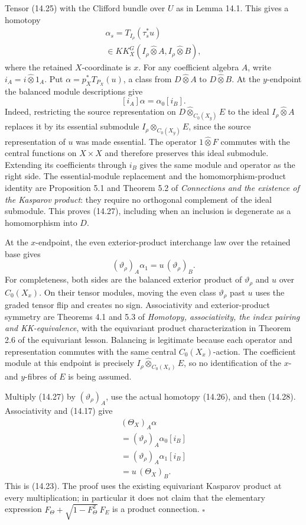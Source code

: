 \documentclass[
  11pt,
]{article}
\begin{document}
Tensor (14.25) with the Clifford bundle over \(U\) as in Lemma 14.1.
This gives a homotopy \[
\begin{gathered}
\alpha_s=T_{I_\rho}(\tau_s^*u)\\
\in KK_X^G(I_\rho\widehat\otimes A,
                    I_\rho\widehat\otimes B),
\end{gathered}
\tag{14.26}
\] where the retained \(X\)-coordinate is \(x\). For any coefficient
algebra \(A\), write \(i_A=i\widehat\otimes1_A\). Put
\(\alpha=p_X^*T_{P_X}(u)\), a class from \(D\widehat\otimes A\) to
\(D\widehat\otimes B\). At the \(y\)-endpoint the balanced module
descriptions give \[
[i_A]\alpha=\alpha_0[i_B].
\tag{14.27}
\] Indeed, restricting the source representation on
\(D\widehat\otimes_{C_0(X_y)}E\) to the ideal
\(I_\rho\widehat\otimes A\) replaces it by its essential submodule
\(I_\rho\widehat\otimes_{C_0(X_y)}E\), since the source representation
of \(u\) was made essential. The operator \(1\widehat\otimes F\)
commutes with the central functions on \(X\times X\) and therefore
preserves this ideal submodule. Extending its coefficients through
\(i_B\) gives the same module and operator as the right side. The
essential-module replacement and the homomorphism-product identity are
Proposition 5.1 and Theorem 5.2 of \emph{Connections and the existence
of the Kasparov product}: they require no orthogonal complement of the
ideal submodule. This proves (14.27), including when an inclusion is
degenerate as a homomorphism into \(D\).

At the \(x\)-endpoint, the even exterior-product interchange law over
the retained base gives \[
(\vartheta_\rho)_A\alpha_1
 =u\,(\vartheta_\rho)_B.
\tag{14.28}
\] For completeness, both sides are the balanced exterior product of
\(\vartheta_\rho\) and \(u\) over \(C_0(X_x)\). On their tensor modules,
moving the even class \(\vartheta_\rho\) past \(u\) uses the graded
tensor flip and creates no sign. Associativity and exterior-product
symmetry are Theorems 4.1 and 5.3 of \emph{Homotopy, associativity, the
index pairing and KK-equivalence}, with the equivariant product
characterization in Theorem 2.6 of the equivariant lesson. Balancing is
legitimate because each operator and representation commutes with the
same central \(C_0(X_x)\)-action. The coefficient module at this
endpoint is precisely \(I_\rho\widehat\otimes_{C_0(X_x)}E\), so no
identification of the \(x\)- and \(y\)-fibres of \(E\) is being assumed.

Multiply (14.27) by \((\vartheta_\rho)_A\), use the actual homotopy
(14.26), and then (14.28). Associativity and (14.17) give \[
\begin{gathered}
(\Theta_X)_A\alpha\\
=(\vartheta_\rho)_A\alpha_0[i_B]\\
=(\vartheta_\rho)_A\alpha_1[i_B]\\
=u\,(\Theta_X)_B.
\end{gathered}
\tag{14.29}
\] This is (14.23). The proof uses the existing equivariant Kasparov
product at every multiplication; in particular it does not claim that
the elementary expression \(F_{\Theta}+\sqrt{1-F_{\Theta}^2}\,F_E\) is a
product connection. \(\square\)
\end{document}
